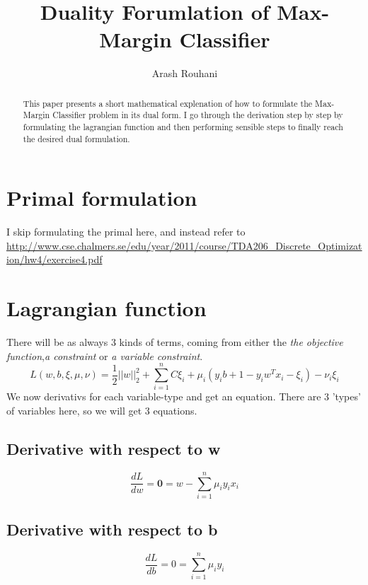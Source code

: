 \documentclass[a4paper,11pt]{article}
\title{Duality Forumlation of Max-Margin Classifier}
\author{Arash Rouhani}
\begin{document}
\maketitle

\begin{abstract}
This paper presents a short mathematical explenation of how to formulate
the Max-Margin Classifier problem in its dual form.
I go through the derivation step by step by formulating the lagrangian
function and then performing sensible steps to finally reach the desired dual formulation. 

\end{abstract}

\section{Primal formulation}
I skip formulating the primal here, and instead refer to \url{http://www.cse.chalmers.se/edu/year/2011/course/TDA206_Discrete_Optimization/hw4/exercise4.pdf}
\section{Lagrangian function}
There will be as always 3 kinds of terms, coming from either the \textit{the objective function},\textit{a constraint} or \textit{a variable constraint}.
\begin{equation}
L(w, b, \xi, \mu, \nu) = \frac{1}{2} ||w||^2_2 + \sum\limits_{i=1}^n {C\xi_i + \mu_i(y_ib + 1 - y_iw^Tx_i - \xi_i) - \nu_i\xi_i}
\end{equation}
We now derivativs for each variable-type and get an equation. There are 3 'types' of variables here, so we will get 3 equations.

\subsection{Derivative with respect to w}
  \begin{equation}
    \frac{dL}{dw} = \textbf{0} = w - \sum\limits_{i=1}^n {\mu_i y_i x_i}
  \end{equation}
\subsection{Derivative with respect to b}
  \begin{equation}
    \frac{dL}{db} = 0 = \sum\limits_{i=1}^n {\mu_i y_i}
  \end{equation}
\end{document}
